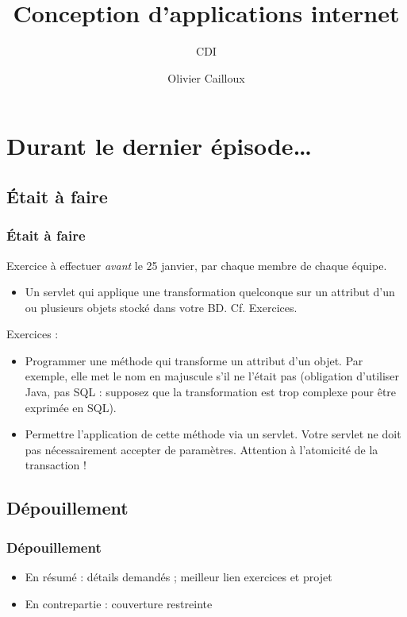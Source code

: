 \documentclass[english, french]{beamer}
\title{Conception d’applications internet}
\subtitle{CDI}
\author{Olivier Cailloux}
\institute[LAMSADE]{LAMSADE, Université Paris-Dauphine}
\date{}
\begin{document}


\begin{frame}[plain]
   \titlepage
\end{frame}
\addtocounter{framenumber}{-1}

\section[Dernier épisode]{Durant le dernier épisode…}
\subsection{Était à faire}
\begin{frame}
	\frametitle{Était à faire}
	Exercice à effectuer \emph{avant} le 25 janvier, par chaque membre de chaque équipe.
	\begin{itemize}
		\item[+\footnote{Le + indique que cet aspect intervient dans la note}] Un servlet qui applique une transformation quelconque sur un attribut d’un ou plusieurs objets stocké dans votre BD. Cf. Exercices.
	\end{itemize}
	Exercices :
	\begin{itemize}
		\item Programmer une méthode qui transforme un attribut d’un objet. Par exemple, elle met le nom en majuscule s’il ne l’était pas (obligation d’utiliser Java, pas SQL : supposez que la transformation est trop complexe pour être exprimée en SQL).
		\item[+] Permettre l’application de cette méthode via un servlet. Votre servlet ne doit pas nécessairement accepter de paramètres. Attention à l’atomicité de la transaction !
	\end{itemize}
\end{frame}

\subsection{Dépouillement}
\begin{frame}
	\frametitle{Dépouillement}
	\begin{itemize}
		\item En résumé : détails demandés ; meilleur lien exercices et projet
		\item En contrepartie : couverture restreinte
	\end{itemize}
\end{frame}
\end{document}
